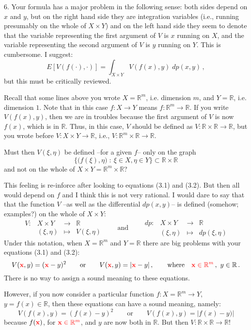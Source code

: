\documentclass[12pt,reqno]{amsart}
\def\R{{\mathbb R }}
\def\red#1{{\color{red} #1}}
\def\mid{\;:\ }
\begin{document}
\begin{description}[style=unboxed,leftmargin=0cm,itemsep=3ex]
6. Your formula has a major problem in the following sense: both sides
depend on $x$ and $y$, but on the right hand side they are integration
variables (i.e., running presumably on the whole of $X\times Y$) and
on the left hand side they seem to denote that the variable representing
the first argument of $V$ is $x$ running on $X$, and the variable
representing the second argument of $V$ is $y$ running on $Y$.
This is cumbersome.
I suggest:
$$
E[V(f(\cdot),\cdot)] = \int_{X\times Y} V(f(x),y)\;dp(x,y)\,,
$$
but this must be critically reviewed.

Recall that some lines above you wrote $X=\R^m$, i.e. dimension $m$,
and $Y=\R$, i.e. dimension $1$.
Note that in this case $f:X\to Y$ means $f:\R^m\to\R$.
If you write $V(f(x),y)$, then we are in troubles because the first
argument of $V$ is now $f(x)$, which is in $\R$.
Thus, in this case, $V$ should be defined as $V:\R\times\R\to\R$,
but you wrote before $V:X\times Y\to\R$, i.e., $V:\R^m\times\R\to\R$.

Must then $V(\xi,\eta)$ be defined --for a given $f$-- only on the graph 
$$
\{ \big( f(\xi),\eta \big)\mid \xi\in X, \eta\in Y \}\subset\R\times\R
$$
and not on the whole of $X\times Y=\R^m\times\R$?

This feeling is re-inforce after looking to equations (3.1) and (3.2).
But then all would depend on $f$ and I think this is not very rational.
I would dare to say that that the function $V$ --as well as the differential
$dp(x,y)$-- is defined (somehow; examples?) on the whole of $X\times Y$:
$$
\begin{array}{rccl}
V: & X\times Y  & \longrightarrow & \R     \\
   & (\xi,\eta) & \longmapsto     & V(\xi,\eta)
\end{array}
\qquad\text{and}\qquad
\begin{array}{rccl}
dp: & X\times Y  & \longrightarrow & \R     \\
    & (\xi,\eta) & \longmapsto     & dp(\xi,\eta)
\end{array}
$$
Under this notation, when $X=\R^m$ and $Y=\R$ there are big problems
with your equations (3.1) and (3.2):
$$
V(\red{\mathbf{x}},y)=(\red{\mathbf{x}}-y)^2 
\qquad\text{or}\qquad 
V(\red{\mathbf{x}},y)=|\red{\mathbf{x}}-y|\,,
\qquad\text{where}\quad\red{\mathbf{x}\in\R^m}\,,\ y\in\R\,.
$$
There is no way to assign a sound meaning to these equations.

However, if you now consider a particular function 
$f:X=\R^m\to Y$, $y=f(x)\in\R$, then these equations \red{can} have a
sound meaning, namely:
$$
V(f(x),y)=(f(x)-y)^2 \qquad\text{or}\qquad V(f(x),y)=|f(x)-y)|
$$
because $f(\red{\mathbf{x}})$, for $\red{\mathbf{x}\in\R^m}$,
and $y$ are now both in $\R$.
But then $V:\R\times\R\to\R$!


\end{description}
\end{document}

